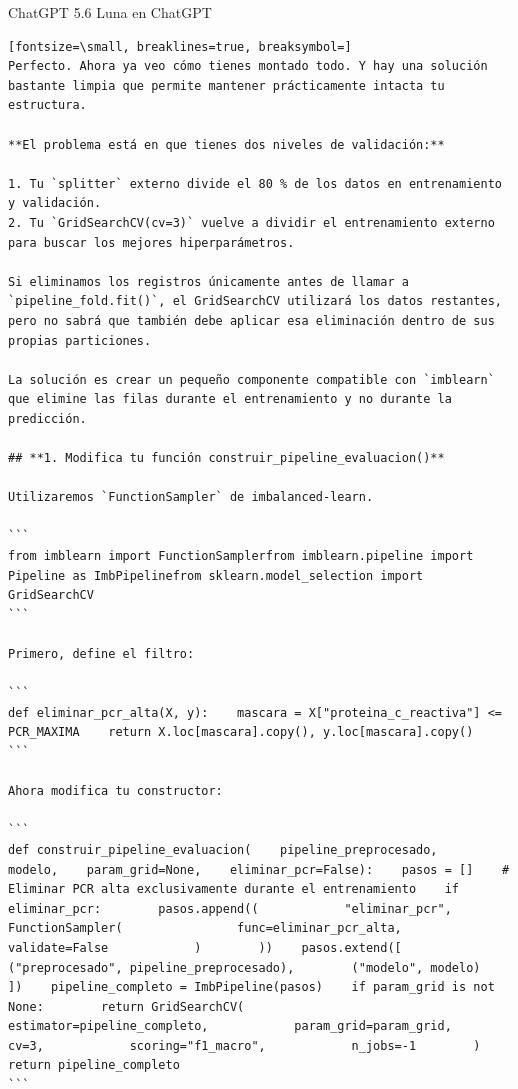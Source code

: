 \documentclass[12pt,a4paper,oneside]{book}
\begin{document}
\begin{iaresp}{ChatGPT 5.6 Luna en ChatGPT}
\begin{Verbatim}[fontsize=\small, breaklines=true, breaksymbol=]
Perfecto. Ahora ya veo cómo tienes montado todo. Y hay una solución bastante limpia que permite mantener prácticamente intacta tu estructura.

**El problema está en que tienes dos niveles de validación:**

1. Tu `splitter` externo divide el 80 % de los datos en entrenamiento y validación.
2. Tu `GridSearchCV(cv=3)` vuelve a dividir el entrenamiento externo para buscar los mejores hiperparámetros.

Si eliminamos los registros únicamente antes de llamar a `pipeline_fold.fit()`, el GridSearchCV utilizará los datos restantes, pero no sabrá que también debe aplicar esa eliminación dentro de sus propias particiones.

La solución es crear un pequeño componente compatible con `imblearn` que elimine las filas durante el entrenamiento y no durante la predicción.

## **1. Modifica tu función construir_pipeline_evaluacion()**

Utilizaremos `FunctionSampler` de imbalanced-learn.

```
from imblearn import FunctionSamplerfrom imblearn.pipeline import Pipeline as ImbPipelinefrom sklearn.model_selection import GridSearchCV
```

Primero, define el filtro:

```
def eliminar_pcr_alta(X, y):    mascara = X["proteina_c_reactiva"] <= PCR_MAXIMA    return X.loc[mascara].copy(), y.loc[mascara].copy()
```

Ahora modifica tu constructor:

```
def construir_pipeline_evaluacion(    pipeline_preprocesado,    modelo,    param_grid=None,    eliminar_pcr=False):    pasos = []    # Eliminar PCR alta exclusivamente durante el entrenamiento    if eliminar_pcr:        pasos.append((            "eliminar_pcr",            FunctionSampler(                func=eliminar_pcr_alta,                validate=False            )        ))    pasos.extend([        ("preprocesado", pipeline_preprocesado),        ("modelo", modelo)    ])    pipeline_completo = ImbPipeline(pasos)    if param_grid is not None:        return GridSearchCV(            estimator=pipeline_completo,            param_grid=param_grid,            cv=3,            scoring="f1_macro",            n_jobs=-1        )    return pipeline_completo
```


\end{Verbatim}
\end{iaresp}
\end{document}
